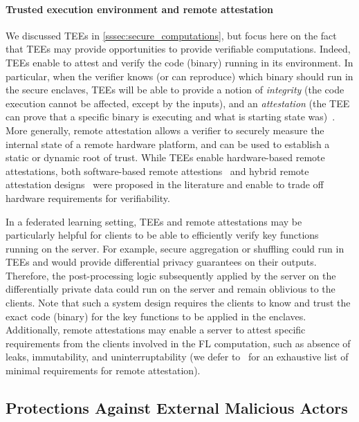 \documentclass[11pt]{article}
\begin{document}
\paragraph{Trusted execution environment and remote attestation} We discussed TEEs in \cref{sssec:secure_computations}, but focus here on the fact that TEEs may provide opportunities to provide verifiable computations.  Indeed, TEEs enable to attest and verify the code (binary) running in its environment.  In particular, when the verifier knows (or can reproduce) which binary should run in the secure enclaves, TEEs will be able to provide a notion of \emph{integrity} (the code execution cannot be affected, except by the inputs), and an \emph{attestation} (the TEE can prove that a specific binary is executing and what is starting state was)~\cite{subramanyan2017formal, DBLP:conf/eurosp/TramerZLHJS17}. More generally, remote attestation allows a verifier to securely measure the internal state of a remote hardware platform, and can be used to establish a static or dynamic root of trust. While TEEs enable hardware-based remote attestations, both software-based remote attestions~\cite{DBLP:series/ais/SeshadriLPDK07} and hybrid remote attestation designs~\cite{DBLP:conf/ndss/EldefrawyTFP12,DBLP:conf/eurosys/KoeberlSSV14} were proposed in the literature and enable to trade off hardware requirements for verifiability.

In a federated learning setting, TEEs and remote attestations may be particularly helpful for clients to be able to efficiently verify key functions running on the server. For example, secure aggregation or shuffling could run in TEEs and would provide differential privacy guarantees on their outputs. Therefore, the post-processing logic subsequently applied by the server on the differentially private data could run on the server and remain oblivious to the clients. Note that such a system design requires the clients to know and trust the exact code (binary) for the key functions to be applied in the enclaves. Additionally, remote attestations may enable a server to attest specific requirements from the clients involved in the FL computation, such as absence of leaks, immutability, and uninterruptability (we defer to~\cite{DBLP:conf/date/FrancillonNRT14} for an exhaustive list of minimal requirements for remote attestation). 



\subsection{Protections Against External Malicious Actors}
\label{ssec:adv_clients_analysts}
\end{document}
